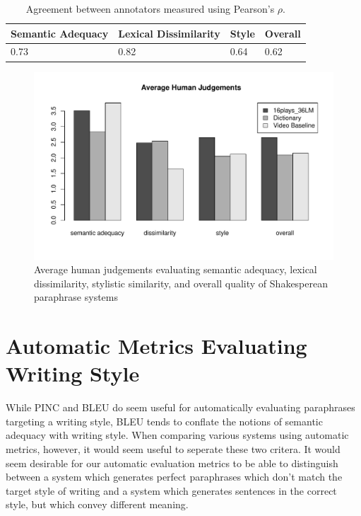 \documentclass[10pt,a5paper,twoside]{article}
\begin{document}
\begin{table}[ht]
  \begin{center}
    \begin{tabular}{|l|l|l|l|}
      \hline
      Semantic Adequacy & Lexical Dissimilarity & Style & Overall \\
      \hline
      \hline
      0.73 & 0.82 & 0.64 & 0.62 \\
      \hline
    \end{tabular}
  \end{center}
  \caption{Agreement between annotators measured using Pearson's $\rho$.}
  \label{annotator_agreement}
\end{table}

\begin{figure}
  \begin{center}
    \includegraphics[width=5in]{figures/human_judgements.pdf}
  \end{center}
  \caption{Average human judgements evaluating semantic adequacy, lexical dissimilarity, stylistic similarity, and overall quality
    of Shakesperean paraphrase systems} 
  \label{human_judgements}
\end{figure}

\section{Automatic Metrics Evaluating Writing Style}
While PINC and BLEU do seem useful for automatically evaluating paraphrases targeting a  writing style, BLEU tends to conflate the notions of
semantic adequacy with writing style.  When comparing various systems using automatic metrics, however, it would seem useful
to seperate these two critera.  It would seem desirable for our automatic evaluation metrics to be able to distinguish
between a system which generates perfect paraphrases which don't match the target style of writing and a system which
generates sentences in the correct style, but which convey different meaning.
\end{document}
